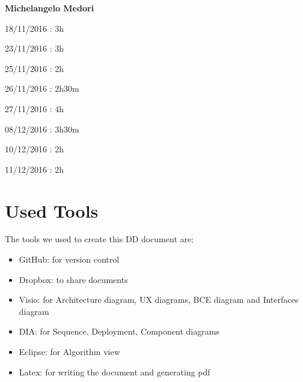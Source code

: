 \documentclass{article}
\begin{document}
\begin{flushleft}
\textbf{Michelangelo Medori} \break
\begin{description}
\item 18/11/2016 : 3h
\item 23/11/2016 : 3h
\item 25/11/2016 : 2h
\item 26/11/2016 : 2h30m
\item 27/11/2016 : 4h
\item 08/12/2016 : 3h30m 
\item 10/12/2016 : 2h
\item 11/12/2016 : 2h
\end{description}

\newpage
\section{Used Tools} %
The tools we used to create this DD document are:
\begin{itemize}

\item GitHub: for version control
\item Dropbox: to share documents
\item Visio: for Architecture diagram, UX diagrams, BCE diagram and Interfaces diagram
\item DIA: for Sequence, Deployment, Component diagrams
\item Eclipse: for Algorithm view
\item Latex: for writing the document and generating pdf

\end{itemize}




\end{flushleft}
\end{document}
